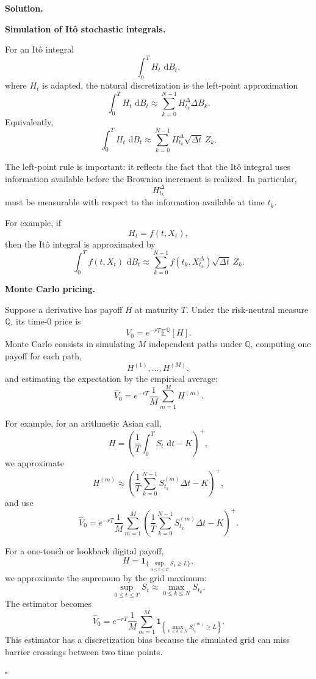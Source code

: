 \documentclass[11pt]{article}
\theoremstyle{plain}
\newcommand{\dd}{\,\mathrm{d}}
\newcommand{\1}{\mathbf{1}}
\theoremstyle{definition}
\newenvironment{solution}
{\par\medskip\noindent\textbf{Solution.}\par\medskip}
{\hfill$\square$\par\medskip}
\newenvironment{solutionpart}[1]
{\par\medskip\noindent\textbf{#1.}\par\smallskip}
{\par\medskip}
\begin{document}
\begin{solution}
\begin{solutionpart}{Simulation of It\^o stochastic integrals}

For an It\^o integral
\[
\int_0^T H_t\,\dd B_t,
\]
where $H_t$ is adapted, the natural discretization is the left-point approximation
\[
\boxed{
\int_0^T H_t\,\dd B_t
\approx
\sum_{k=0}^{N-1} H_{t_k}^{\Delta}\Delta B_k.
}
\]
Equivalently,
\[
\int_0^T H_t\,\dd B_t
\approx
\sum_{k=0}^{N-1}
H_{t_k}^{\Delta}\sqrt{\Delta t}\,Z_k.
\]

The left-point rule is important: it reflects the fact that the It\^o integral uses information available before the Brownian increment is realized. In particular,
\[
H_{t_k}^{\Delta}
\]
must be measurable with respect to the information available at time $t_k$.

For example, if
\[
H_t=f(t,X_t),
\]
then the It\^o integral is approximated by
\[
\boxed{
\int_0^T f(t,X_t)\,\dd B_t
\approx
\sum_{k=0}^{N-1}
f(t_k,X_{t_k}^{\Delta})\sqrt{\Delta t}\,Z_k.
}
\]
\end{solutionpart}

\begin{solutionpart}{Monte Carlo pricing}

Suppose a derivative has payoff $H$ at maturity $T$. Under the risk-neutral measure
$\mathbb Q$, its time-$0$ price is
\[
V_0=e^{-rT}\mathbb E^{\mathbb Q}[H].
\]
Monte Carlo consists in simulating $M$ independent paths under $\mathbb Q$, computing one payoff
for each path,
\[
H^{(1)},\dots,H^{(M)},
\]
and estimating the expectation by the empirical average:
\[
\boxed{
\widehat V_0
=
e^{-rT}\frac1M\sum_{m=1}^M H^{(m)}.
}
\]

For example, for an arithmetic Asian call,
\[
H
=
\left(
\frac1T\int_0^T S_t\,\dd t-K
\right)^+,
\]
we approximate
\[
H^{(m)}
\approx
\left(
\frac1T\sum_{k=0}^{N-1} S_{t_k}^{(m)}\Delta t-K
\right)^+,
\]
and use
\[
\boxed{
\widehat V_0
=
e^{-rT}
\frac1M\sum_{m=1}^M
\left(
\frac1T\sum_{k=0}^{N-1} S_{t_k}^{(m)}\Delta t-K
\right)^+.
}
\]

For a one-touch or lookback digital payoff,
\[
H=\mathbf 1_{\{\sup_{0\le t\le T}S_t\ge L\}},
\]
we approximate the supremum by the grid maximum:
\[
\sup_{0\le t\le T}S_t
\approx
\max_{0\le k\le N}S_{t_k}.
\]
The estimator becomes
\[
\boxed{
\widehat V_0
=
e^{-rT}
\frac1M\sum_{m=1}^M
\mathbf 1_{\left\{\max_{0\le k\le N}S_{t_k}^{(m)}\ge L\right\}}.
}
\]
This estimator has a discretization bias because the simulated grid can miss barrier crossings between two time points.
\end{solutionpart}


\end{solution}
\end{document}
